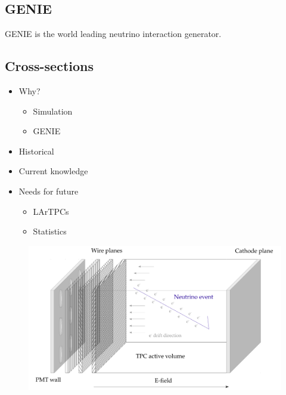 \subsection{GENIE}

    GENIE is the world leading neutrino interaction generator.  

\subsection{Cross-sections}
    
    \begin{itemize}

        \item Why?
        
        \begin{itemize}

            \item Simulation
            \item GENIE

        \end{itemize}
        
        \item Historical
        \item Current knowledge
        \item Needs for future
        
        \begin{itemize}

            \item LArTPCs
            \item Statistics

        \end{itemize}

    \end{itemize}

    
    
    \begin{figure}[h!]
        \center
        \includegraphics[width=\textwidth]{images/LArTPC.pdf}
    \end{figure}

